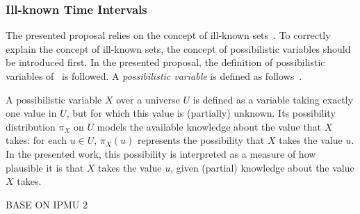 

\subsubsection{Ill-known Time Intervals}
\label{subsec:representation-time-intervals}

The presented proposal relies on the concept of ill-known sets~\cite{Dubois88b}. To correctly explain the concept of ill-known sets, the concept of possibilistic variables should be introduced first. In the presented proposal, the definition of possibilistic variables of~\cite{Pon11} is followed. A \emph{possibilistic variable} is defined as follows~\cite{Pon11}.

\begin{svgraybox}
\vspace{-10pt}
\begin{definition}
A possibilistic variable $X$ over a universe $U$ is defined as a variable taking exactly one value in $U$, but for which this value is (partially) unknown. Its possibility distribution $\pi_X$ on $U$ models the available knowledge about the value that $X$ takes: for each $u\in U$, $\pi_X(u)$ represents the possibility that $X$ takes the value $u$. In the presented work, this possibility is interpreted as a measure of how plausible it is that $X$ takes the value $u$, given (partial) knowledge about the value $X$ takes.
\end{definition}
\vspace{-10pt}
\end{svgraybox}

BASE ON IPMU 2

